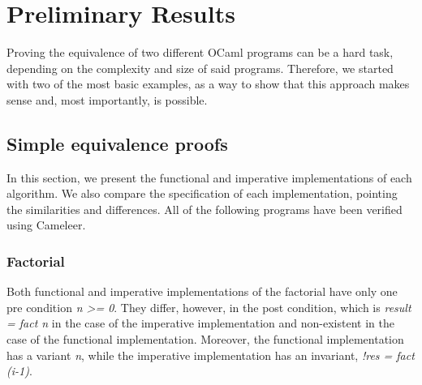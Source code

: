 
%

\chapter{Preliminary Results}
\label{cha:preliminary_results}

Proving the equivalence of two different OCaml programs can be a hard task, depending on the complexity and size of said programs.
Therefore, we started with two of the most basic examples, as a way to show that this approach makes sense and, most importantly, is possible.


\section{Simple equivalence proofs}
\label{sec:results_eq_proofs}

In this section, we present the functional and imperative implementations of each algorithm. We also compare the specification of each implementation, pointing the similarities and differences. All of the following programs have been verified using Cameleer.


\subsection{Factorial}
\label{sub:factorial}

Both functional and imperative implementations of the factorial have only one pre condition \emph{n >= 0}.
They differ, however, in the post condition, which is \emph{result = fact n} in the case of the imperative implementation and non-existent in the case of the functional implementation.
Moreover, the functional implementation has a variant \emph{n}, while the imperative implementation has an invariant, \emph{!res = fact (i-1)}. 

\bigskip
\newcommand{\provername}[1]{\cellcolor{yellow!25}
\begin{sideways}\textbf{#1}~~\end{sideways}}
\newcommand{\explanation}[1]{\cellcolor{yellow!13}lemma \texttt{#1}}
\newcommand{\transformation}[1]{\cellcolor{yellow!13}transformation \texttt{#1}}
\newcommand{\subgoal}[2]{\cellcolor{yellow!13}subgoal #2}
\newcommand{\valid}[1]{\cellcolor{green!13}#1}
\newcommand{\unknown}[1]{\cellcolor{red!20}#1}
\newcommand{\invalid}[1]{\cellcolor{red!50}#1}
\newcommand{\timeout}[1]{\cellcolor{red!20}(#1)}
\newcommand{\outofmemory}[1]{\cellcolor{red!20}(#1)}
\newcommand{\noresult}{\multicolumn{1}{>{\columncolor[gray]{0.8}}c|}{~}}
\newcommand{\highfailure}{\cellcolor{red!50}FAILURE}
    
